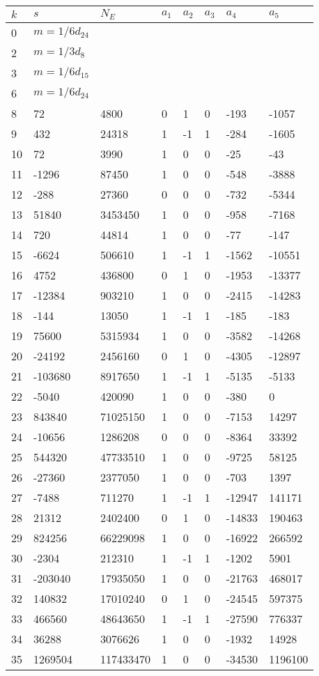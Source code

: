 \documentclass{amsart}
\begin{document}
\begin{longtable}{|l|l|l|lllll|}
\hline
$k$ & $s$ & $N_E$ & $a_1$ & $a_2$ & $a_3$ & $a_4$ & $a_5$\\
\hline
0&$m=1/6d_{24}$&&\multicolumn{5}{c|}{}\\
2&$m=1/3d_{8}$&&\multicolumn{5}{c|}{}\\
3&$m=1/6d_{15}$&&\multicolumn{5}{c|}{}\\
6&$m=1/6d_{24}$&&\multicolumn{5}{c|}{}\\
8&72&4800&0&1&0&-193&-1057\\
9&432&24318&1&-1&1&-284&-1605\\
10&72&3990&1&0&0&-25&-43\\
11&-1296&87450&1&0&0&-548&-3888\\
12&-288&27360&0&0&0&-732&-5344\\
13&51840&3453450&1&0&0&-958&-7168\\
14&720&44814&1&0&0&-77&-147\\
15&-6624&506610&1&-1&1&-1562&-10551\\
16&4752&436800&0&1&0&-1953&-13377\\
17&-12384&903210&1&0&0&-2415&-14283\\
18&-144&13050&1&-1&1&-185&-183\\
19&75600&5315934&1&0&0&-3582&-14268\\
20&-24192&2456160&0&1&0&-4305&-12897\\
21&-103680&8917650&1&-1&1&-5135&-5133\\
22&-5040&420090&1&0&0&-380&0\\
23&843840&71025150&1&0&0&-7153&14297\\
24&-10656&1286208&0&0&0&-8364&33392\\
25&544320&47733510&1&0&0&-9725&58125\\
26&-27360&2377050&1&0&0&-703&1397\\
27&-7488&711270&1&-1&1&-12947&141171\\
28&21312&2402400&0&1&0&-14833&190463\\
29&824256&66229098&1&0&0&-16922&266592\\
30&-2304&212310&1&-1&1&-1202&5901\\
31&-203040&17935050&1&0&0&-21763&468017\\
32&140832&17010240&0&1&0&-24545&597375\\
33&466560&48643650&1&-1&1&-27590&776337\\
34&36288&3076626&1&0&0&-1932&14928\\
35&1269504&117433470&1&0&0&-34530&1196100\\

\end{longtable}
\end{document}
